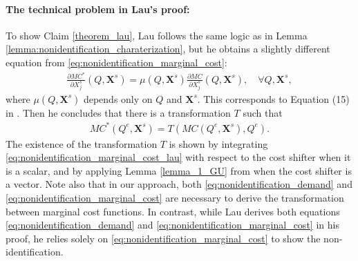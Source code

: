 \documentclass[11pt, a4paper]{article}
\begin{document}
\paragraph{The technical problem in Lau's proof:}
To show Claim \ref{theorem_lau}, Lau follows the same logic as in Lemma \ref{lemma:nonidentification_charaterization}, but he obtains a slightly different equation from \eqref{eq:nonidentification_marginal_cost}:
\begin{align}
    \frac{\partial MC^{*}}{\partial X^{s}_j}(Q, \bm{X}^{s}) = \mu(Q, \bm{X}^{s}) \frac{\partial MC}{\partial X^{s}_j}(Q, \bm{X}^{s}),\quad \forall Q, \bm{X}^{s}, \label{eq:nonidentification_marginal_cost_lau}
\end{align}
where $\mu(Q, \bm{X}^{s})$ depends only on $Q$ and $\bm{X}^{s}$.
This corresponds to Equation (15) in \citet{lauIdentifying1982}.
Then he concludes that there is a transformation $T$ such that 
\begin{align}
    MC^{*}(Q^e, \bm{X}^{s}) = T(MC(Q^e, \bm{X}^{s}), Q^e). \label{eq:mc_transformation_lau}
\end{align}
The existence of the transformation $T$ is shown by integrating \eqref{eq:nonidentification_marginal_cost_lau} with respect to the cost shifter when it is a scalar, and by applying Lemma \ref{lemma_1_GU} from \citet{goldmanNote1964} when the cost shifter is a vector.
Note also that in our approach, both \eqref{eq:nonidentification_demand} and \eqref{eq:nonidentification_marginal_cost} are necessary to derive the transformation between marginal cost functions. 
In contrast, while Lau derives both equations \eqref{eq:nonidentification_demand} and \eqref{eq:nonidentification_marginal_cost} in his proof, he relies solely on \eqref{eq:nonidentification_marginal_cost} to show the non-identification.
\end{document}
